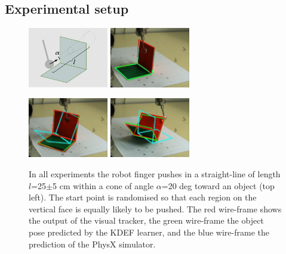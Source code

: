 \subsection{Experimental setup}\label{sec:Experiment.Setup}
\begin{figure}[t]
\centerline{
\includegraphics[width=3.5cm]{training}
\includegraphics[width=3.5cm]{complex1}
}
\centerline{
\includegraphics[width=3.5cm]{complex2}
\includegraphics[width=3.5cm]{complex4}
}
\caption[Setup]{In all experiments the robot finger pushes in a straight-line of length $l$=25$\pm$5 cm within a cone of angle $\alpha$=20 deg toward an object (top left). The start point is randomised so that each region on the vertical face is equally likely to be pushed. The red wire-frame shows the output of the visual tracker, the green wire-frame the object pose predicted by the KDEF learner, and the blue wire-frame the prediction of the PhysX simulator.}
\label{fig:Setup}
\end{figure}
